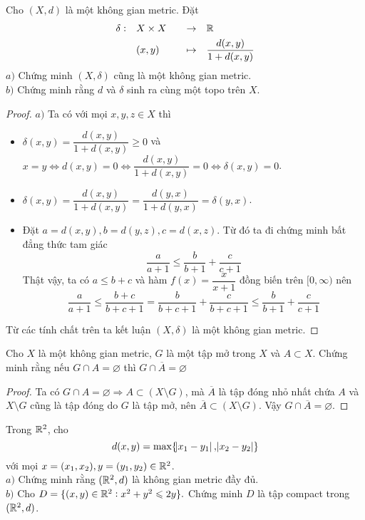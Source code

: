 \begin{exercise}{16}
    Cho $(X,d)$ là một không gian metric. Đặt
    \begin{alignat*}{3}
        \delta:\quad &X \times X\quad &\rightarrow &\quad \R\\
        & (x,y)\quad &\mapsto &\quad \frac{d(x,y)}{1+d(x,y)}
    \end{alignat*}
    $a)$ Chứng minh $(X,\delta)$ cũng là một không gian metric.\\
    $b)$ Chứng minh rằng $d$ và $\delta$ sinh ra cùng một topo trên $X$.
\end{exercise}

\begin{proof}
$a)$ Ta có với mọi $x, y, z \in X$ thì
\begin{itemize}
    \item $\delta(x,y) = \dfrac{d(x,y)}{1+d(x,y)} \geq 0$ và $x = y \Leftrightarrow d(x,y) = 0 \Leftrightarrow \dfrac{d(x,y)}{1+d(x,y)} = 0 \Leftrightarrow \delta(x,y) = 0$.
    \item $\delta(x,y) = \dfrac{d(x,y)}{1+d(x,y)} = \dfrac{d(y,x)}{1+d(y,x)} = \delta(y,x)$.
    \item Đặt $a = d(x,y), b = d(y,z), c = d(x, z)$. Từ đó ta đi chứng minh bất đẳng thức tam giác
    $$
        \dfrac{a}{a+1} \leq \dfrac{b}{b+1} + \dfrac{c}{c+1}
    $$
    Thật vậy, ta có $a \leq b + c$ và hàm $f(x) = \dfrac{x}{x+1}$ đồng biến trên $[0,\infty)$ nên
    $$
        \frac{a}{a+1} \leq \frac{b+c}{b+c+1} = \frac{b}{b+c+1} + \frac{c}{b+c+1} \leq \frac{b}{b+1} + \frac{c}{c+1}
    $$
\end{itemize}
Từ các tính chất trên ta kết luận $(X,\delta)$ là một không gian metric.
\end{proof}

\begin{exercise}{19}
    Cho $X$ là một không gian metric, $G$ là một tập mở trong $X$ và $A \subset X$. Chứng minh rằng nếu $G \cap A = \varnothing$ thì $G \cap \overline{A} = \varnothing$
\end{exercise}

\begin{proof}
Ta có $G \cap A = \varnothing \Rightarrow A \subset (X \setminus G)$, mà $\overline{A}$ là tập đóng nhỏ nhất chứa $A$ và $X \setminus G$ cũng là tập đóng do $G$ là tập mở, nên $\overline{A} \subset (X \setminus G)$. Vậy $G \cap \overline{A} = \varnothing$.
\end{proof}

\begin{exercise}{22}
    Trong $\mathbb R^2$, cho
    $$
        d(x,y) = \max\{\abs{x_1-y_1}, \abs{x_2-y_2}\}
    $$
    với mọi $x = (x_1,x_2), y = (y_1,y_2) \in \mathbb R^2$.\\[3mm]
    $a)$ Chứng minh rằng $(\mathbb R^2,d)$ là không gian metric đầy đủ.\\
    $b)$ Cho $D = \{(x,y) \in \mathbb R^2: x^2 + y^2 \leqslant 2y\}.$ Chứng minh $D$ là tập compact trong $(\mathbb R^2,d)$.
\end{exercise}


